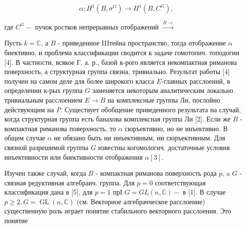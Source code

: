 \documentclass[10pt]{article}
\begin{document}
\[

\alpha: H^{1}\left(B, \sigma^{G}\right) \rightarrow H^{1}\left(B, C^{G}\right),

\]



где $C^{G}-$ пучок ростков непрерывных отображений $\stackrel{B \rightarrow}{\rightarrow}$



Пусть $k=\mathbb{C}$, а $B$ - приведенное IIIтейна пространство, тогда отображение $\alpha$ биективно, и проблема классификации сводится к задаче гомотопич. топодогии [4]. В частности, всякое Г. а. р., базой к-рого является некомпактная риманова поверхность, а структурная группа связна, тривиально. Результат работы [4] получен на самом деле для более широкого класса $E$-главных расслоений, в определении к-рых группа $G$ заменяется некоторым аналитическим локально тривиальным расслоением $E \rightarrow B$ на комплексные группы Ли, послойно действующим на $P$. Существует обобщение приведенного результата на случай, когда структурная группа есть банахова комплексная группа Ли [2]. Если же $B$ - компактная риманова поверхность, то $\alpha$ сюръективно, но не инъективно. В общем случае $\alpha$ не обязано быть ни инъективным, ни сюръективным. Для связной разрешимой группы $G$ известны когомологич. достаточные условия инъективности или биективности отображения $\alpha[3]$.



Изучен также случай, когда $B$ - компактная риманова поверхность рода $p$, a $G$ - связная редуктивная алгебраич. группа. Для $p=0$ соответствующая классификация дана в [5], для $p=1$ прІ $G=G L(n, \mathbb{C})-$ в [1]. В случае $p \geqslant 2, G=\operatorname{GL}(n, \mathbb{C})$ (см. Векторное алгебрачческое расслоение) существенную роль играет понятие стабильного векторного расслоения. Это понятие
\end{document}
